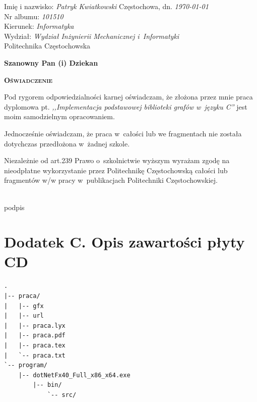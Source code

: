 \documentclass[a4paper,12pt,polish,oneside,openright]{thesis}
\begin{document}
Imię i nazwisko: \emph{Patryk Kwiatkowski} \hfill Częstochowa, dn. \emph{\today} \\
Nr albumu: \emph{101510} \\
Kierunek: \emph{Informatyka} \\
Wydział: \emph{Wydział Inżynierii Mechanicznej i~Informatyki} \\

\vfill
Politechnika Częstochowska
\vfill
\begin{flushright}
\textbf{Szanowny Pan (i) Dziekan} \hspace*{1cm}
\end{flushright}
\vfill
\begin{center}
\textbf{\textsc{\large Oświadczenie}}
\end{center}
\vfill

Pod rygorem odpowiedzialności karnej oświadczam, że złożona przez mnie praca dyplomowa pt. \emph{,,Implementacja podstawowej biblioteki grafów w~języku C''} jest moim samodzielnym opracowaniem.

Jednocześnie oświadczam, że praca w~całości lub we fragmentach nie została dotychczas przedłożona w~żadnej szkole.

Niezależnie od art.239 Prawo o~szkolnictwie wyższym wyrażam zgodę na nieodpłatne wykorzystanie przez Politechnikę Częstochowską całości lub fragmentów w/w pracy w~publikacjach Politechniki Częstochowskiej.

\vfill

\begin{center}
	\begin{minipage}{0.7\textwidth}
		\begin{flushright}
		\begin{minipage}{0.4\textwidth}
			\begin{center}
			\dotfill\\
			podpis
			\end{center}
		\end{minipage}
		\end{flushright}
	\end{minipage}
\end{center}

\setlength{\parskip}{\oldparskip}

\chapter*{Dodatek C. Opis zawartości płyty CD}
\label{chap:cd}
\begin{lstlisting}[basicstyle={\small},caption={Struktura plików zamieszczonych na płycie CD}]
.
|-- praca/
|   |-- gfx
|   |-- url
|   |-- praca.lyx
|   |-- praca.pdf
|   |-- praca.tex
|   `-- praca.txt
`-- program/
    |-- dotNetFx40_Full_x86_x64.exe
        |-- bin/
            `-- src/
\end{lstlisting}
\end{document}
